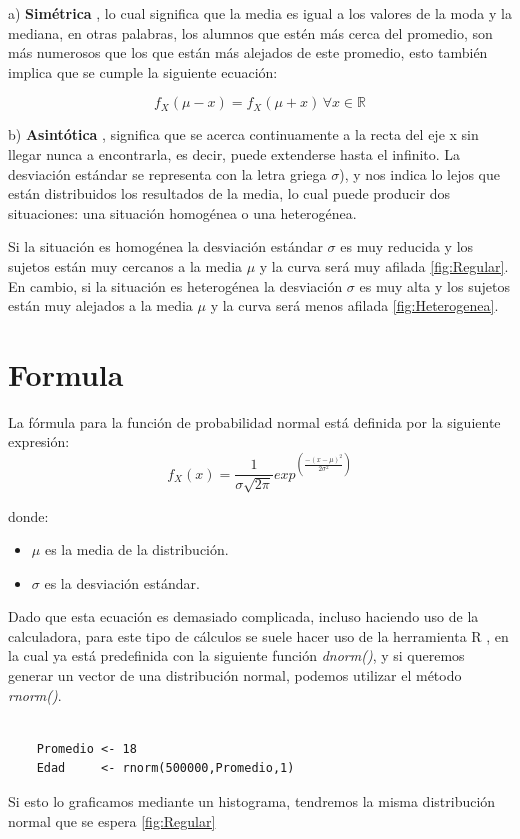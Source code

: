 \documentclass[]{article}
\begin{document}
 a) \textbf{Simétrica} , lo cual significa que la media es igual a los valores de la moda y la mediana, en otras palabras, los alumnos que estén más cerca del promedio, son más numerosos que los que están más alejados de este promedio, esto también implica que se cumple la siguiente ecuación:
 
\[f_X(\mu - x) = f_X(\mu + x) \, \forall x\in \mathbb{R} \]

  
b)	\textbf{Asintótica} , significa que se acerca continuamente a la recta del eje x sin llegar nunca a encontrarla, es decir, puede extenderse hasta el infinito.
La desviación estándar se representa con la letra griega $\sigma$), y nos indica lo lejos que están distribuidos los resultados de la media, lo cual puede producir dos situaciones: una situación homogénea o una heterogénea.

Si la situación es homogénea la desviación estándar $\sigma$ es muy reducida y los sujetos están muy cercanos a la media  $\mu$ y la curva será muy afilada \autoref{fig:Regular}.
En cambio, si la situación es heterogénea la desviación $\sigma$ es muy alta y los sujetos están muy alejados a la media $\mu$ y la curva será menos afilada \autoref{fig:Heterogenea}.


\section{Formula}
La fórmula para la función de probabilidad normal está definida por la siguiente expresión:
\[f_X(x) = \frac{1}{\sigma \sqrt{2\pi }}exp^{(\frac{-(x-\mu)^{2}}{2\sigma^{2} })}\]

donde:
\begin{itemize}
	\item $\mu$ es la media de la distribución.
	\item $\sigma$ es la desviación estándar.
\end{itemize}
Dado que esta ecuación es demasiado complicada, incluso haciendo uso de la calculadora, para este tipo de cálculos se suele hacer uso de la herramienta R \cite{rproject}, en la cual ya está predefinida con la siguiente función \textit{dnorm()}, y si queremos generar un vector de una distribución normal, podemos utilizar el método \textit{rnorm()}.
  \begin{lstlisting}

    Promedio <- 18
    Edad     <- rnorm(500000,Promedio,1)
   \end{lstlisting}

Si esto lo graficamos mediante un histograma, tendremos la misma distribución normal que se espera  \autoref{fig:Regular}
\end{document}
